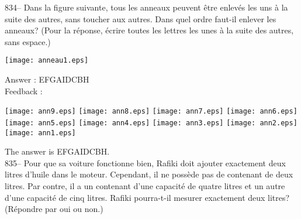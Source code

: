 ﻿\documentclass[letterpaper, 12pt]{article}
\begin{document}
834-- Dans la figure suivante, tous les anneaux peuvent \^etre enlev\'es les
uns \`a la suite des autres, sans toucher aux autres.  Dans quel ordre
faut-il enlever les anneaux? (Pour la r\'eponse, \'ecrire toutes les lettres
les unes \`a la suite des autres, sans espace.)\\
    \begin{center}
    \texttt{[image: anneau1.eps]}
    \end{center}


Answer : EFGAIDCBH  \\

Feedback : \\
    \begin{center}
    \texttt{[image: ann9.eps]}
    \texttt{[image: ann8.eps]}
    \texttt{[image: ann7.eps]}
    \texttt{[image: ann6.eps]}
    \texttt{[image: ann5.eps]}
    \texttt{[image: ann4.eps]}
    \texttt{[image: ann3.eps]}
    \texttt{[image: ann2.eps]}
    \texttt{[image: ann1.eps]}
    \end{center}


The answer is EFGAIDCBH.\\

835-- Pour que sa voiture fonctionne bien, Rafiki doit ajouter exactement
deux litres d'huile dans le moteur.  Cependant, il ne poss\`ede pas de
contenant de deux litres.  Par contre, il a un contenant d'une capacit\'e de
quatre litres et un autre d'une capacit\'e de cinq litres.  Rafiki
pourra-t-il mesurer exactement deux litres?  (R\'epondre par oui ou non.)\\
\end{document}
